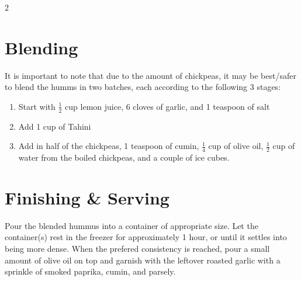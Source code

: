 \documentclass[10pt]{article}
\begin{document}
\begin{multicols}{2}
    \section{Blending}

        It is important to note that due to the amount of chickpeas, it may be best/safer to blend the humms in two batches, each according to the following 3 stages:

        \begin{enumerate}
            \item Start with $\frac{1}{2}$ cup lemon juice, 6 cloves of garlic, and 1 teaspoon of salt
            \item Add 1 cup of Tahini
            \item Add in half of the chickpeas, 1 teaspoon of cumin, $\frac{1}{4}$ cup of olive oil, $\frac{1}{2}$ cup of water from the boiled chickpeas, and a couple of ice cubes.
        \end{enumerate}

    \section{Finishing \& Serving}

        Pour the blended hummus into a container of appropriate size. Let the container(s) rest in the freezer for approximately 1 hour, or until it settles into being more dense. When the prefered consistency is reached, pour a small amount of olive oil on top and garnish with the leftover roasted garlic with a sprinkle of smoked paprika, cumin, and parsely.

    \end{multicols}
\end{document}
